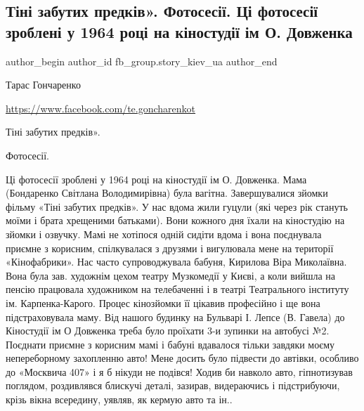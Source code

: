  
 
 
 
 
 
\subsection{Тіні забутих предків». Фотосесії. Ці фотосесії зроблені у 1964 році на кіностудії ім О. Довженка}
\label{sec:12_08_2021.fb.fb_group.story_kiev_ua.1.foto_kinostudia_dovzhenko_1964}
 
\ifcmt
 author_begin
   author_id fb_group.story_kiev_ua
 author_end
\fi

Тарас Гончаренко\par
\url{https://www.facebook.com/te.goncharenkot}

Тіні забутих предків».

Фотосесії.

Ці фотосесії зроблені у 1964 році на кіностудії ім О. Довженка. Мама
(Бондаренко Світлана Володимирівна) була вагітна. Завершувалися зйомки фільму
«Тіні забутих предків». У нас вдома жили гуцули (які через рік стануть моїми і
брата хрещеними батьками). Вони кожного дня їхали на кіностудію на зйомки і
озвучку. Мамі не хотіпося одній сидіти вдома і вона поєднувала приємне з
корисним, спілкувалася з друзями і вигулювала мене на території «Кінофабрики».
Нас часто супроводжувала бабуня, Кирилова Віра Миколаївна. Вона була зав.
художнім цехом театру Музкомедії у Києві, а коли вийшла на пенсію працювала
художником на телебаченні і в театрі Театрального інституту ім.
Карпенка-Карого. Процес кінозйомки її цікавив професійно і ще вона
підстраховувала маму. Від нашого будинку на Бульварі І. Лепсе (В. Гавела) до
Кіностудії ім О Довженка треба було проїхати 3-и зупинки на автобусі №2.
Поєднати приємне з корисним мамі і бабуні вдавалося тільки завдяки моєму
непереборному захопленню авто! Мене досить було підвести до автівки, особливо
до «Москвича 407» і я б нікуди не подівся! Ходив би навколо авто, гіпнотизував
поглядом, роздивлявся блискучі деталі, зазирав, видераючись і підстрибуючи,
крізь вікна всередину, уявляв, як кермую авто та ін..

